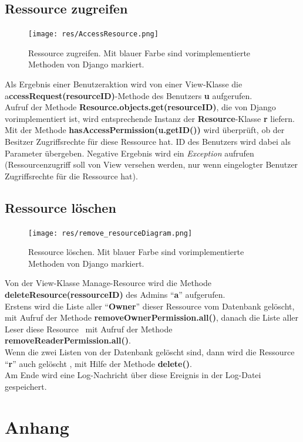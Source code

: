 \documentclass[parskip=full,11pt]{scrartcl}
\begin{document}
 \subsection{Ressource zugreifen}
 \begin{figure}[ht!]
 	\centering
 	\texttt{[image: res/AccessResource.png]}
 	\caption{Ressource zugreifen. Mit blauer Farbe sind vorimplementierte Methoden von Django markiert.}
 \end{figure}
 
Als Ergebnis einer Benutzeraktion wird von einer View-Klasse die a\textbf{ccessRequest(resourceID)}-Methode des Benutzers \textbf{u} aufgerufen.\\
Aufruf der Methode \textbf{Resource.objects.get(resourceID)}, die von Django vorimplementiert ist, wird entsprechende Instanz der \textbf{Resource}-Klasse \textbf{r} liefern.\\
Mit der Methode\textbf{ hasAccessPermission(u.getID())} wird überprüft, ob der Besitzer Zugriffsrechte für diese Ressource hat. ID des Benutzers wird dabei als Parameter übergeben. Negative Ergebnis wird ein \textit{Exception} aufrufen (Ressourcenzugriff soll von View versehen werden, nur wenn eingelogter Benutzer Zugriffsrechte für die Ressource hat).
 
 
 \newpage
 
 \subsection{Ressource löschen}
 \begin{figure}[ht!]
 	\centering
 	\texttt{[image: res/remove\_resourceDiagram.png]}
 	\caption{Ressource löschen. Mit blauer Farbe sind vorimplementierte Methoden von Django markiert.}
 \end{figure}
 
 
Von der View-Klasse Manage-Resource wird die Methode \textbf{deleteResource(ressourceID)} des Admins \enquote{\textbf{a}}  aufgerufen.\\ Erstens wird die Liste aller \enquote{\textbf{Owner}} dieser Ressource vom Datenbank gelöscht, mit Aufruf der Methode \textbf{removeOwnerPermission.all()}, danach die Liste aller Leser diese Resource \ mit Aufruf der Methode \textbf{removeReaderPermission.all()}.\\
Wenn die zwei Listen von der Datenbank gelöscht sind, dann wird die Ressource \enquote{\textbf{r}} auch gelöscht , mit Hilfe der Methode \textbf{delete()}.\\ Am Ende wird eine Log-Nachricht über diese Ereignis  in der Log-Datei gespeichert.\\
 
 \newpage
 \section{Anhang}
 \newpage
{}
\printglossary	
	
 
\end{document}
